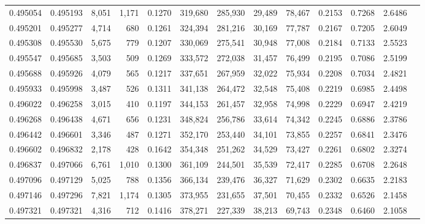 \begin{tabular}{rrrrrrrrrrrrr}
0.495054 & 0.495193 &  8,051 & 1,171 &                                     0.1270 & 319,680 & 285,930 &  29,489 &  78,467 & 0.2153 & 0.7268 & 2.6486 \\
0.495201 & 0.495277 &  4,714 &   680 &                                     0.1261 & 324,394 & 281,216 &  30,169 &  77,787 & 0.2167 & 0.7205 & 2.6049 \\
0.495308 & 0.495530 &  5,675 &   779 &                                     0.1207 & 330,069 & 275,541 &  30,948 &  77,008 & 0.2184 & 0.7133 & 2.5523 \\
0.495547 & 0.495685 &  3,503 &   509 &                                     0.1269 & 333,572 & 272,038 &  31,457 &  76,499 & 0.2195 & 0.7086 & 2.5199 \\
0.495688 & 0.495926 &  4,079 &   565 &                                     0.1217 & 337,651 & 267,959 &  32,022 &  75,934 & 0.2208 & 0.7034 & 2.4821 \\
0.495933 & 0.495998 &  3,487 &   526 &                                     0.1311 & 341,138 & 264,472 &  32,548 &  75,408 & 0.2219 & 0.6985 & 2.4498 \\
0.496022 & 0.496258 &  3,015 &   410 &                                     0.1197 & 344,153 & 261,457 &  32,958 &  74,998 & 0.2229 & 0.6947 & 2.4219 \\
0.496268 & 0.496438 &  4,671 &   656 &                                     0.1231 & 348,824 & 256,786 &  33,614 &  74,342 & 0.2245 & 0.6886 & 2.3786 \\
0.496442 & 0.496601 &  3,346 &   487 &                                     0.1271 & 352,170 & 253,440 &  34,101 &  73,855 & 0.2257 & 0.6841 & 2.3476 \\
0.496602 & 0.496832 &  2,178 &   428 &                                     0.1642 & 354,348 & 251,262 &  34,529 &  73,427 & 0.2261 & 0.6802 & 2.3274 \\
0.496837 & 0.497066 &  6,761 & 1,010 &                                     0.1300 & 361,109 & 244,501 &  35,539 &  72,417 & 0.2285 & 0.6708 & 2.2648 \\
0.497096 & 0.497129 &  5,025 &   788 &                                     0.1356 & 366,134 & 239,476 &  36,327 &  71,629 & 0.2302 & 0.6635 & 2.2183 \\
0.497146 & 0.497296 &  7,821 & 1,174 &                                     0.1305 & 373,955 & 231,655 &  37,501 &  70,455 & 0.2332 & 0.6526 & 2.1458 \\
0.497321 & 0.497321 &  4,316 &   712 &                                     0.1416 & 378,271 & 227,339 &  38,213 &  69,743 & 0.2348 & 0.6460 & 2.1058 \\

\end{tabular}
